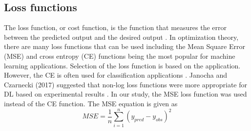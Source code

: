 \subsection{Loss functions}

The loss function, or cost function, is the function that measures the error between the predicted output and the desired output \citep{Goodfellow2016}. In optimization theory, there are many loss functions that can be used including the Mean Square Error (MSE) and cross entropy (CE) functions being the most popular for machine learning applications.  Selection of the loss function is based on the application. However, the CE is often used for classification applications \citep{Kline2005, Wu2017}. Janocha and Czarnecki (2017) suggested that non-log loss functions were more appropriate for DL based on experimental results \citep{Janocha2017}. In our study, the MSE loss function was used instead of the CE function. The MSE equation is given as 
%
\begin{equation}
\label{eq:MSE}
MSE = \frac{1}{n} \sum_{i=1}^{n} \left( y_{pred} - y_{obs} \right)^{2}
\end{equation}
%
